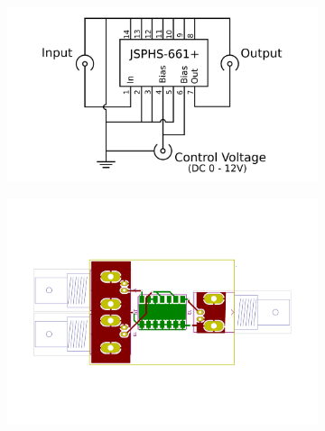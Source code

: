 \begin{figure}
	\centering
	\begin{subfigure}{0.4\textwidth}
		\centering
		\includegraphics[width=\textwidth]{Chapters/Deflection/circuit_phase}
		\caption{}
		\label{fig:circuit_phase}
	\end{subfigure}
	\hspace{0.1\textwidth}
	\begin{subfigure}{0.4\textwidth}
		\centering
		\includegraphics[width=\textwidth]{Chapters/Deflection/PCB_phase3}
		\caption{}
		\label{fig:PCB_phase}
	\end{subfigure}
	\caption{}
	\label{fig:PhaseShifter}
\end{figure}




